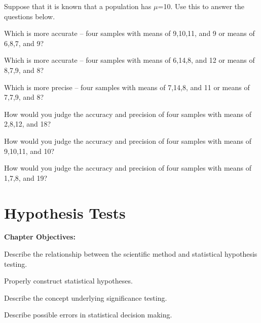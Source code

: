 \documentclass[10pt,openany]{book}\usepackage[]{graphicx}\usepackage[]{color}
\begin{document}
\begin{exsection}
  \item \label{revex:SamplingDistPA} Suppose that it is known that a population has $\mu$=10.  Use this to answer the questions below. 
  \begin{Enumerate}
    \item Which is more accurate -- four samples with means of 9,10,11, and 9 or means of 6,8,7, and 9?
    \item Which is more accurate -- four samples with means of 6,14,8, and 12 or means of 8,7,9, and 8?
    \item Which is more precise -- four samples with means of 7,14,8, and 11 or means of 7,7,9, and 8?
    \item How would you judge the accuracy and precision of four samples with means of 2,8,12, and 18?
    \item How would you judge the accuracy and precision of four samples with means of 9,10,11, and 10?
    \item How would you judge the accuracy and precision of four samples with means of 1,7,8, and 19?
  \end{Enumerate}
\end{exsection}



\chapter{Hypothesis Tests} \label{chap:HypothesisTests}
\begin{ChapObj}{\boxwidth}
  \textbf{Chapter Objectives:}
  \begin{Enumerate}
    \item Describe the relationship between the scientific method and statistical hypothesis testing.
    \item Properly construct statistical hypotheses.
    \item Describe the concept underlying significance testing.
    \item Describe possible errors in statistical decision making.
  \end{Enumerate}
\end{ChapObj}

\minitoc
\newpage
\end{document}
